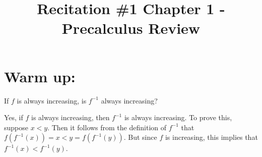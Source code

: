 \documentclass[handout,nooutcomes]{ximera}
\title{Recitation \#1 Chapter 1 - Precalculus Review}
\begin{document}
\begin{abstract}		\end{abstract}
\maketitle

\section*{Warm up:}
   
If $f$ is always increasing, is $f^{-1}$ always increasing?

			 \begin{freeResponse}		 
			Yes, if $f$ is always increasing, then $f^{-1}$ is always increasing.  To prove this, suppose $x < y$.  Then it follows from the definition of $f^{-1}$ that $f(f^{-1}(x)) = x < y =  f(f^{-1}(y))$.  But since $f$ is increasing, this implies that $f^{-1}(x)  < f^{-1}(y)$.	
			\end{freeResponse}
\end{document}
